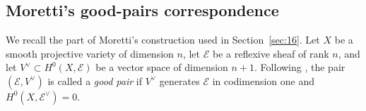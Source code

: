 \documentclass[12pt]{amsart}
\numberwithin{equation}{section}
\theoremstyle{definition}
\theoremstyle{remark}
\newcommand{\Z}{\mathbf Z}
\newcommand{\PP}{\mathbf P}
\newcommand{\cO}{\mathcal O}
\newcommand{\tr}{\operatorname{tr}}
\begin{document}


\subsection{Moretti's good-pairs correspondence}
\label{subsec:moretti-good-pairs}

We recall the part of Moretti's construction used in Section~\ref{sec:16}.
Let $X$ be a smooth projective variety of dimension $n$, let $\mathcal E$
be a reflexive sheaf of rank $n$, and let
$V^\vee\subset H^0(X,\mathcal E)$ be a vector space of dimension $n+1$.
Following \cite[Definition~1.3]{Moretti}, the pair
$(\mathcal E,V^\vee)$ is called a \emph{good pair} if $V^\vee$ generates
$\mathcal E$ in codimension one and
$H^0(X,\mathcal E^\vee)=0$.
\end{document}
